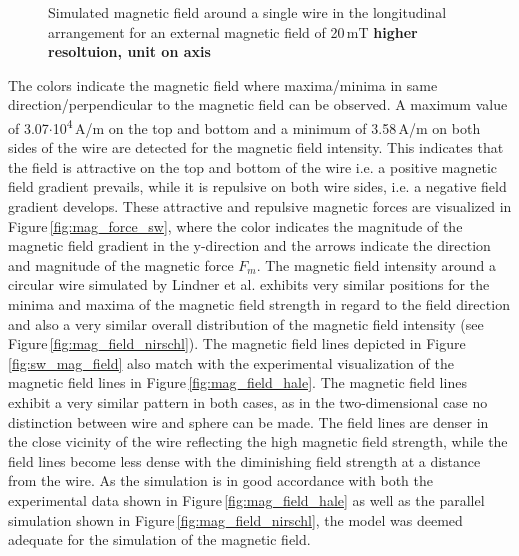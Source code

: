\begin{figure}[H]
        \caption[Simulated magnetic field around a single wire]{Simulated magnetic field around a single wire in the longitudinal arrangement for an external magnetic field of 20\,mT \textbf{higher resoltuion, unit on axis}}
        \label{fig:sw_fm_mag_field}
  \end{figure}

% 

The colors indicate the magnetic field where maxima/minima in same direction/perpendicular to the magnetic field can be observed. A maximum value of 3.07$\cdotp$10\textsuperscript{4}\,A/m on the top and bottom and a minimum of 3.58\,A/m on both sides of the wire are detected for the magnetic field intensity. This indicates that the field is attractive on the top and bottom of the wire i.e. a positive magnetic field gradient prevails, while it is repulsive on both wire sides, i.e. a negative field gradient develops. These attractive and repulsive magnetic forces are visualized in Figure\,\ref{fig:mag_force_sw}, where the color indicates the magnitude of the magnetic field gradient in the y-direction and the arrows indicate the direction and magnitude of the magnetic force $F_{m}$. The magnetic field intensity around a circular wire simulated by Lindner et al. \cite{lindner2013simulation} exhibits very similar positions for the minima and maxima of the magnetic field strength in regard to the field direction and also a very similar overall distribution of the magnetic field intensity (see Figure\,\ref{fig:mag_field_nirschl}). The magnetic field lines depicted in Figure\,\ref{fig:sw_mag_field} also match with the experimental visualization of the magnetic field lines in Figure\,\ref{fig:mag_field_hale}. The magnetic field lines exhibit a very similar pattern in both cases, as in the two-dimensional case no distinction between wire and sphere can be made. The field lines are denser in the close vicinity of the wire reflecting the high magnetic field strength, while the field lines become less dense with the diminishing field strength at a distance from the wire. As the simulation is in good accordance with both the experimental data shown in Figure\,\ref{fig:mag_field_hale} as well as the parallel simulation shown in Figure\,\ref{fig:mag_field_nirschl}, the model was deemed adequate for the simulation of the magnetic field.  

